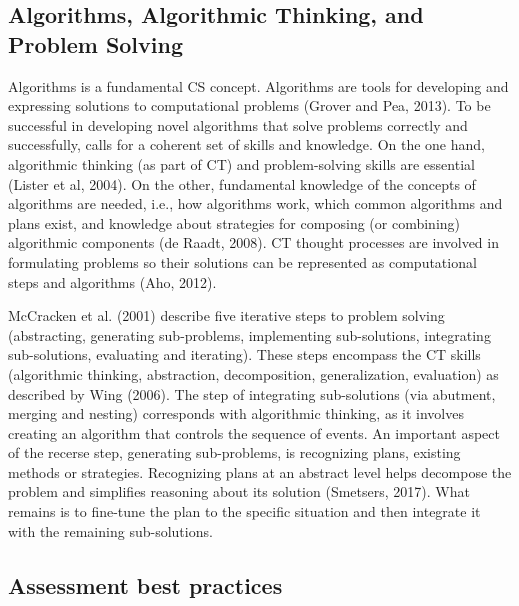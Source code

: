 \subsection{Algorithms, Algorithmic Thinking, and Problem Solving}

Algorithms is a fundamental CS concept. Algorithms are tools for developing and expressing solutions to computational problems (Grover and Pea, 2013). To be successful in developing novel algorithms that solve problems correctly and successfully, calls for a coherent set of skills and knowledge.
On the one hand, algorithmic thinking (as part of CT) and problem-solving skills are essential (Lister et al, 2004). On the other, fundamental knowledge of the concepts of algorithms are needed, i.e., how algorithms work, which common algorithms and plans exist, and knowledge about strategies for composing (or combining) algorithmic components (de Raadt, 2008). CT thought processes are involved in formulating problems so their solutions can be represented as computational steps and algorithms (Aho, 2012).





McCracken et al. (2001) describe five iterative steps to problem solving (abstracting, generating sub-problems, implementing sub-solutions, integrating sub-solutions, evaluating and iterating). These steps encompass the CT skills (algorithmic thinking, abstraction, decomposition, generalization, evaluation) as described by Wing (2006). The step of integrating sub-solutions (via abutment, merging and nesting) corresponds with algorithmic thinking, as it involves creating an algorithm that controls the sequence of events. An important aspect of the recerse step, generating sub-problems, is recognizing plans, existing methods or strategies. Recognizing plans at an abstract level helps decompose the problem and simplifies reasoning about its solution (Smetsers, 2017). What remains is to fine-tune the plan to the specific situation and then integrate it with the remaining sub-solutions.


\subsection{Assessment best practices}

